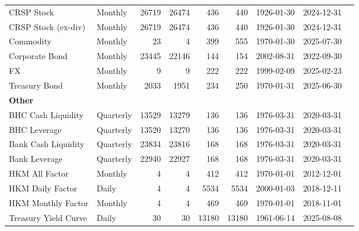 \begin{tabular}{@{}llrrrrlll@{}}
CRSP Stock & Monthly & 26719 & 26474 & 436 & 440 & 1926-01-30 & 2024-12-31 \\
CRSP Stock (ex-div) & Monthly & 26719 & 26474 & 436 & 440 & 1926-01-30 & 2024-12-31 \\
Commodity & Monthly & 23 & 4 & 399 & 555 & 1970-01-30 & 2025-07-30 \\
Corporate Bond & Monthly & 23445 & 22146 & 144 & 154 & 2002-08-31 & 2022-09-30 \\
FX & Monthly & 9 & 9 & 222 & 222 & 1999-02-09 & 2025-02-23 \\
Treasury Bond & Monthly & 2033 & 1951 & 234 & 250 & 1970-01-31 & 2025-06-30 \\
\midrule
\multicolumn{8}{l}{\textbf{Other}} \\
BHC Cash Liquidity & Quarterly & 13529 & 13279 & 136 & 136 & 1976-03-31 & 2020-03-31 \\
BHC Leverage & Quarterly & 13520 & 13270 & 136 & 136 & 1976-03-31 & 2020-03-31 \\
Bank Cash Liquidity & Quarterly & 23834 & 23816 & 168 & 168 & 1976-03-31 & 2020-03-31 \\
Bank Leverage & Quarterly & 22940 & 22927 & 168 & 168 & 1976-03-31 & 2020-03-31 \\
HKM All Factor & Monthly & 4 & 4 & 412 & 412 & 1970-01-01 & 2012-12-01 \\
HKM Daily Factor & Daily & 4 & 4 & 5534 & 5534 & 2000-01-03 & 2018-12-11 \\
HKM Monthly Factor & Monthly & 4 & 4 & 469 & 469 & 1970-01-01 & 2018-11-01 \\
Treasury Yield Curve & Daily & 30 & 30 & 13180 & 13180 & 1961-06-14 & 2025-08-08 \\
\bottomrule
\end{tabular}
